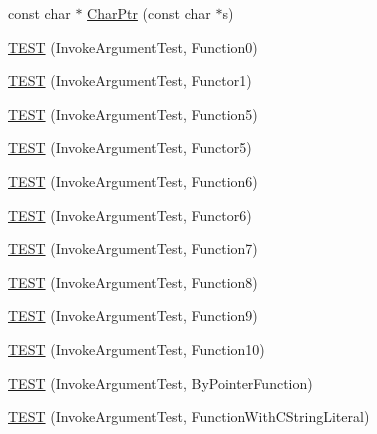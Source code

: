 \begin{DoxyCompactItemize}
\item 
const char $\ast$ \mbox{\hyperlink{namespacetesting_1_1gmock__generated__actions__test_aa0f16da563ba1f4dd15c8a4fd9048fd3}{Char\+Ptr}} (const char $\ast$s)
\item 
\mbox{\hyperlink{namespacetesting_1_1gmock__generated__actions__test_aee4ab8d88ec59a7e3b91d919a6ed34da}{T\+E\+ST}} (Invoke\+Argument\+Test, Function0)
\item 
\mbox{\hyperlink{namespacetesting_1_1gmock__generated__actions__test_a47d12c8e504971d1f1c17df8d90bff82}{T\+E\+ST}} (Invoke\+Argument\+Test, Functor1)
\item 
\mbox{\hyperlink{namespacetesting_1_1gmock__generated__actions__test_a6afe3cf31ef3f5a9d6fd6af05c9de95c}{T\+E\+ST}} (Invoke\+Argument\+Test, Function5)
\item 
\mbox{\hyperlink{namespacetesting_1_1gmock__generated__actions__test_aab59917791fb297d6735d46e9a862be1}{T\+E\+ST}} (Invoke\+Argument\+Test, Functor5)
\item 
\mbox{\hyperlink{namespacetesting_1_1gmock__generated__actions__test_ae3f8bdac5c2ea1cf56ff1484ebb9a44e}{T\+E\+ST}} (Invoke\+Argument\+Test, Function6)
\item 
\mbox{\hyperlink{namespacetesting_1_1gmock__generated__actions__test_a789c7e8ee88243dc4a53841f6a8da3c6}{T\+E\+ST}} (Invoke\+Argument\+Test, Functor6)
\item 
\mbox{\hyperlink{namespacetesting_1_1gmock__generated__actions__test_a3e13c2ccf384c80c66116418e1b3ccde}{T\+E\+ST}} (Invoke\+Argument\+Test, Function7)
\item 
\mbox{\hyperlink{namespacetesting_1_1gmock__generated__actions__test_a5d583a32b46a306139d32ea9a1d575a9}{T\+E\+ST}} (Invoke\+Argument\+Test, Function8)
\item 
\mbox{\hyperlink{namespacetesting_1_1gmock__generated__actions__test_a3a278f02e1633feda3dea30d810a49ea}{T\+E\+ST}} (Invoke\+Argument\+Test, Function9)
\item 
\mbox{\hyperlink{namespacetesting_1_1gmock__generated__actions__test_afe4653b181e199417b004c4485152010}{T\+E\+ST}} (Invoke\+Argument\+Test, Function10)
\item 
\mbox{\hyperlink{namespacetesting_1_1gmock__generated__actions__test_ac3ff9db96cb7a664ef44d20eb0a7a71f}{T\+E\+ST}} (Invoke\+Argument\+Test, By\+Pointer\+Function)
\item 
\mbox{\hyperlink{namespacetesting_1_1gmock__generated__actions__test_a698f1a80b7fed18141fd170524908885}{T\+E\+ST}} (Invoke\+Argument\+Test, Function\+With\+C\+String\+Literal)

\end{DoxyCompactItemize}
